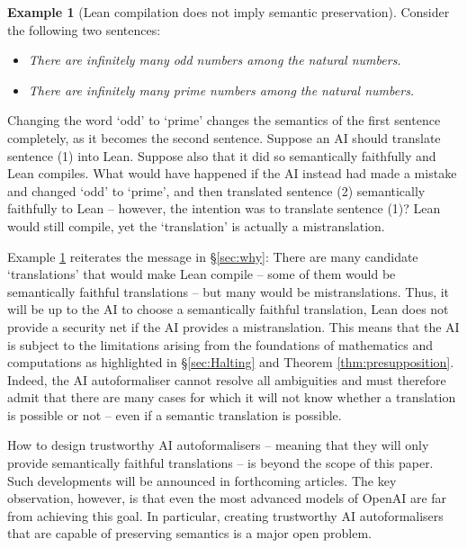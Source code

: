 \documentclass[10pt, a4paper, reqno]{amsart}
\numberwithin{equation}{section}
\theoremstyle{definition}
\newtheorem{example}[theorem]{Example}
\theoremstyle{definition}
\begin{document}
\begin{example}[Lean compilation does not imply semantic preservation]\label{ex:23}
Consider the following two sentences: 
\begin{itemize}
\item[(1)] \emph{There are infinitely many odd numbers among the natural numbers.}
\item[(2)] \emph{There are infinitely many prime numbers among the natural numbers.}
\end{itemize}
Changing the word `odd' to `prime' changes the semantics of the first sentence completely, as it becomes the second sentence. Suppose an AI should translate sentence (1) into Lean. Suppose also that it did so semantically faithfully and Lean compiles. What would have happened if the AI instead had made a mistake and changed `odd' to `prime', and then translated sentence (2) semantically faithfully to Lean -- however, the intention was to translate sentence (1)? Lean would still compile, yet the `translation' is actually a mistranslation. 
\end{example}	

Example \ref{ex:23} reiterates the message in \S \ref{sec:why}: There are many candidate `translations' that would make Lean compile -- some of them would be semantically faithful translations -- but many would be mistranslations. Thus, it will be up to the AI to choose a semantically faithful translation, Lean does not provide a security net if the AI provides a mistranslation. This means that the AI is subject to the limitations arising from the foundations of mathematics and computations as highlighted in \S \ref{sec:Halting} and Theorem \ref{thm:presupposition}. Indeed, the AI autoformaliser cannot resolve all ambiguities and must therefore admit that there are many cases for which it will not know whether a translation is possible or not -- even if a semantic translation is possible.  

How to design trustworthy AI autoformalisers -- meaning that they will only provide semantically faithful translations -- is beyond the scope of this paper. Such developments will be announced in forthcoming articles. The key observation, however, is that even the most advanced models of OpenAI are far from achieving this goal. In particular, creating trustworthy AI autoformalisers that are capable of preserving semantics is a major open problem.





\end{document}

